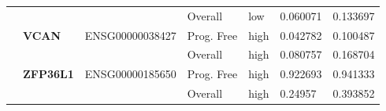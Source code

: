 \begin{spacing}{1}
{\begin{longtable}{|>{\bfseries}p{2cm}|>{\bfseries}p{1.9cm}|p{2.8cm}|p{2cm}|p{2cm}|p{1.5cm}|p{1.5cm}|}
            \hhline{~~~----}
             &          &                 & Overall    & low  & 0.060071 & 0.133697 \\
            \hhline{~======}
             & VCAN     & ENSG00000038427 & Prog. Free & high & 0.042782 & 0.100487 \\
            \hhline{~~~----}
             &          &                 & Overall    & high & 0.080757 & 0.168704 \\
            \hhline{~======}
             & ZFP36L1  & ENSG00000185650 & Prog. Free & high & 0.922693 & 0.941333 \\
            \hhline{~~~----}
             &          &                 & Overall    & high & 0.24957  & 0.393852 \\
        \end{longtable}
    }
\end{spacing}

\newpage


